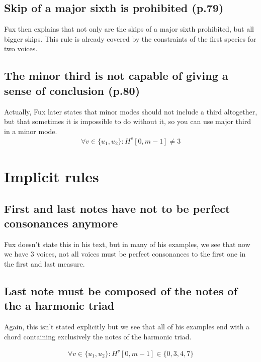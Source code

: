 \subsection{\reddot Skip of a major sixth is prohibited (p.79)}
Fux then explains that not only are the skips of a major sixth prohibited, but all bigger skips. This rule is already covered by the constraints of the first species for two voices. 

\subsection{\reddot The minor third is not capable of giving a sense of conclusion (p.80)}
Actually, Fux later states that minor modes should not include a third altogether, but that sometimes it is impossible to do without it, so you can use major third in a minor mode.
\begin{equation} \begin{aligned}
\forall v \in \{u_1, u_2\} \colon H^{v}[0, m-1] \neq 3
\end{aligned} \end{equation}


\section{Implicit rules}
\subsection{\reddot First and last notes have not to be perfect consonances anymore} \label{rule:last-chord-not-perfect-anymore}
Fux doesn't state this in his text, but in many of his examples, we see that now we have 3 voices, not all voices must be perfect consonances to the first one in the first and last measure.

\subsection{\reddot Last note must be composed of the notes of the a harmonic triad} \label{rule:last-chord-h-triad}
Again, this isn't stated explicitly but we see that all of his examples end with a chord containing exclusively the notes of the harmonic triad.

\begin{equation} \begin{aligned}
\forall v \in \{u_1, u_2\} \colon H^{v}[0, m-1] \in \{0, 3, 4, 7\}
\end{aligned} \end{equation}


